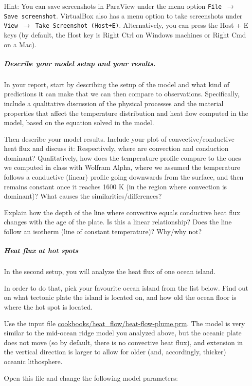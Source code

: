 Hint: You can save screenshots in ParaView under the menu option \texttt{File $\rightarrow$ Save screenshot}. VirtualBox also has a menu option to take screenshots under \texttt{View $\rightarrow$ Take Screenshot (Host+E)}. Alternatively, you can press the Host + E keys (by default, the Host key is Right Ctrl on Windows machines or Right Cmd on a Mac). 

\subparagraph{Describe your model setup and your results.}
In your report, start by describing the setup of the model and what kind of predictions it can make that we can then compare to observations. Specifically, include a qualitative discussion of the physical processes and the material properties that affect the temperature distribution and heat flow computed in the model, based on the equation solved in the model. 

Then describe your model results. Include your plot of convective/conductive heat flux and discuss it:
Respectively, where are convection and conduction dominant? 
Qualitatively, how does the temperature profile compare to the ones we computed in class with Wolfram Alpha, 
where we assumed the temperature follows a conductive (linear) profile going downwards from the surface, 
and then remains constant once it reaches 1600 K (in the region where convection is dominant)? 
What causes the similarities/differences?

Explain how the depth of the line where convective equals conductive heat flux changes with the age of the plate. 
Is this a linear relationship? Does the line follow an isotherm (line of constant temperature)? Why/why not?

\subparagraph{Heat flux at hot spots}

In the second setup, you will analyze the heat flux of one ocean island.

In order to do that, pick your favourite ocean island from the list below. Find out on what tectonic plate the island is located on, and how old the ocean floor is where the hot spot is located. 

Use the input file \url{cookbooks/heat_flow/heat-flow-plume.prm}. 
The model is very similar to the mid-ocean ridge model you analyzed above, but the oceanic plate does not move
(so by default, there is no convective heat flux), and extension in the vertical direction is larger 
to allow for older (and, accordingly, thicker) oceanic lithosphere. 

Open this file and change the following model parameters:

